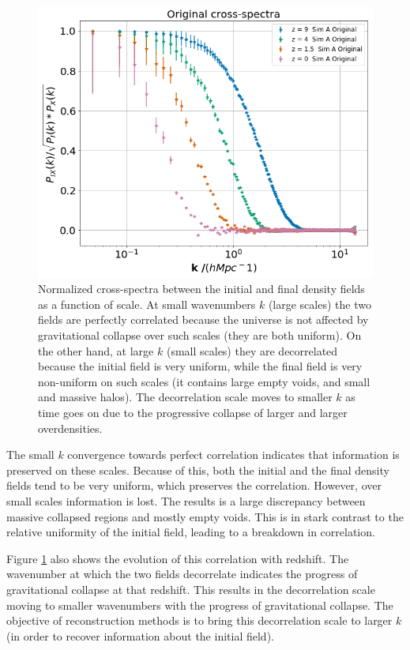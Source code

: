 \begin{figure}
    \centering
    \includegraphics[width=1\columnwidth]{images/perfRecon/orig.png}%
    
    \caption{
    Normalized cross-spectra between the initial and final density fields as a function of scale. At small wavenumbers $k$ (large scales) the two fields are perfectly correlated because the universe is not affected by gravitational collapse over such scales (they are both uniform). On the other hand, at large $k$ (small scales) they are decorrelated because the initial field is very uniform, while the final field is very non-uniform on such scales (it contains large empty voids, and small and massive halos). The decorrelation scale moves to smaller $k$ as time goes on due to the progressive collapse of larger and larger overdensities.
    }
    
    \label{fig:3.1}
\end{figure}

The small $k$ convergence towards perfect correlation indicates that information is preserved on these scales. Because of this, both the initial and the final density fields tend to be very uniform, which preserves the correlation. However, over small scales information is lost. The results is a large discrepancy between massive collapsed regions and mostly empty voids. This is in stark contrast to the relative uniformity of the initial field, leading to a breakdown in correlation.

Figure \ref{fig:3.1} also shows the evolution of this correlation with redshift. The wavenumber at which the two fields decorrelate indicates the progress of gravitational collapse at that redshift. This results in the decorrelation scale moving to smaller wavenumbers with the progress of gravitational collapse. The objective of reconstruction methods is to bring this decorrelation scale to larger $k$ (in order to recover information about the initial field).

